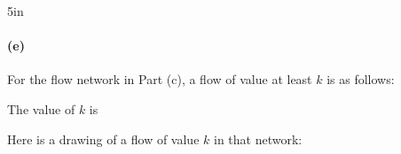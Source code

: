 \begin{answerBox}{5in}   %

  \paragraph{(e)}

  For the flow network in Part (c), a flow of value at least $k$ is as follows:

  The value of $k$ is

  Here is a drawing of a flow of value $k$ in that network:
  \medskip

  \begin{center}
    \begin{blue}

      \REPLACEME



      






\end{blue}
\end{center}
\end{answerBox}
